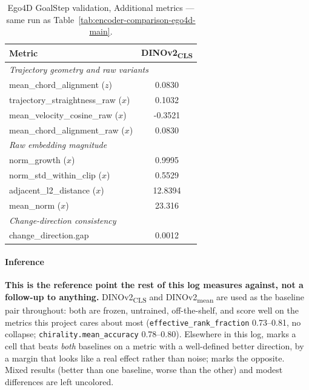 \begin{table}[H]
\centering
\caption{Ego4D GoalStep validation, Additional metrics --- same run as
Table~\ref{tab:encoder-comparison-ego4d-main}.}
\label{tab:encoder-comparison-ego4d-additional}
\begin{tabular}{lc}
\toprule
Metric & DINOv2\textsubscript{CLS} \\
\midrule
\multicolumn{2}{l}{\textit{Trajectory geometry and raw variants}} \\
mean\_chord\_alignment ($z$) & 0.0830 \\
trajectory\_straightness\_raw ($x$) & 0.1032 \\
mean\_velocity\_cosine\_raw ($x$) & -0.3521 \\
mean\_chord\_alignment\_raw ($x$) & 0.0830 \\
\midrule
\multicolumn{2}{l}{\textit{Raw embedding magnitude}} \\
norm\_growth ($x$) & 0.9995 \\
norm\_std\_within\_clip ($x$) & 0.5529 \\
adjacent\_l2\_distance ($x$) & 12.8394 \\
mean\_norm ($x$) & 23.316 \\
\midrule
\multicolumn{2}{l}{\textit{Change-direction consistency}} \\
change\_direction.gap & 0.0012 \\
\bottomrule
\end{tabular}
\end{table}

\paragraph{Inference}

\textbf{This is the reference point the rest of this log measures against, not a
follow-up to anything.} DINOv2\textsubscript{CLS} and DINOv2\textsubscript{mean} are
used as the baseline pair throughout: both are frozen, untrained, off-the-shelf, and
score well on the metrics this project cares about most
(\texttt{effective\_rank\_fraction} 0.73--0.81, no collapse; \texttt{chirality.mean\_accuracy}
0.78--0.80). Elsewhere in this log,  marks a cell that beats \emph{both}
baselines on a metric with a well-defined better direction, by a margin that looks like
a real effect rather than noise;  marks the opposite. Mixed results (better
than one baseline, worse than the other) and modest differences are left uncolored.

